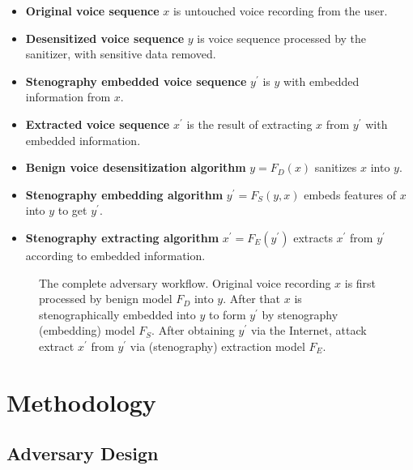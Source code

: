\documentclass[journal]{IEEEtran} %
\begin{document}
\begin{itemize}
    \item \textbf{Original voice sequence} $x$ is untouched voice recording from the user.
    \item \textbf{Desensitized voice sequence} $y$ is voice sequence processed by the sanitizer, with sensitive data removed.
    \item \textbf{Stenography embedded voice sequence} $y^{\prime}$ is $y$ with embedded information from $x$.
    \item \textbf{Extracted voice sequence} $x^{\prime}$ is the result of extracting $x$ from $y^{\prime}$ with embedded information.
    \item \textbf{Benign voice desensitization algorithm} $y = F_D(x)$ sanitizes $x$ into $y$.
    \item \textbf{Stenography embedding algorithm} $y^{\prime} = F_S(y, x)$ embeds features of $x$ into $y$ to get $y^{\prime}$.
    \item \textbf{Stenography extracting algorithm} $x^{\prime} = F_E(y^{\prime})$ extracts $x^{\prime}$ from $y^{\prime}$ according to embedded information.
\end{itemize}

\begin{figure}[!t]
    \caption{The complete adversary workflow. Original voice recording $x$ is first processed by benign model $F_D$ into $y$. After that $x$ is stenographically embedded into $y$ to form $y^{\prime}$ by stenography (embedding) model $F_S$. After obtaining $y^{\prime}$ via the Internet, attack extract $x^{\prime}$ from $y^{\prime}$ via (stenography) extraction model $F_E$.}
    \label{fig:method}
\end{figure}

\section{Methodology}
\label{seg:method}

\subsection{Adversary Design}
\end{document}
